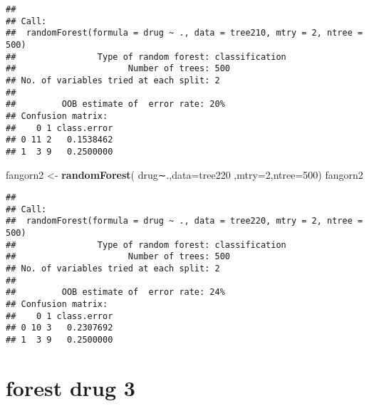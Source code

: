 \documentclass[]{article}
\newenvironment{Shaded}{\begin{snugshade}}{\end{snugshade}}
\newcommand{\KeywordTok}[1]{\textcolor[rgb]{0.13,0.29,0.53}{\textbf{#1}}}
\newcommand{\DataTypeTok}[1]{\textcolor[rgb]{0.13,0.29,0.53}{#1}}
\newcommand{\DecValTok}[1]{\textcolor[rgb]{0.00,0.00,0.81}{#1}}
\newcommand{\StringTok}[1]{\textcolor[rgb]{0.31,0.60,0.02}{#1}}
\newcommand{\CommentTok}[1]{\textcolor[rgb]{0.56,0.35,0.01}{\textit{#1}}}
\newcommand{\OperatorTok}[1]{\textcolor[rgb]{0.81,0.36,0.00}{\textbf{#1}}}
\newcommand{\NormalTok}[1]{#1}
\begin{document}
\begin{verbatim}
## 
## Call:
##  randomForest(formula = drug ~ ., data = tree210, mtry = 2, ntree = 500) 
##                Type of random forest: classification
##                      Number of trees: 500
## No. of variables tried at each split: 2
## 
##         OOB estimate of  error rate: 20%
## Confusion matrix:
##    0 1 class.error
## 0 11 2   0.1538462
## 1  3 9   0.2500000
\end{verbatim}

\begin{Shaded}
\begin{Highlighting}[]
\NormalTok{fangorn2 <-}\StringTok{ }\KeywordTok{randomForest}\NormalTok{( drug∼.,}\DataTypeTok{data=}\NormalTok{tree220  ,}\DataTypeTok{mtry=}\DecValTok{2}\NormalTok{,}\DataTypeTok{ntree=}\DecValTok{500}\NormalTok{)}
\NormalTok{fangorn2}
\end{Highlighting}
\end{Shaded}

\begin{verbatim}
## 
## Call:
##  randomForest(formula = drug ~ ., data = tree220, mtry = 2, ntree = 500) 
##                Type of random forest: classification
##                      Number of trees: 500
## No. of variables tried at each split: 2
## 
##         OOB estimate of  error rate: 24%
## Confusion matrix:
##    0 1 class.error
## 0 10 3   0.2307692
## 1  3 9   0.2500000
\end{verbatim}

\section{forest drug 3}\label{forest-drug-3}

\begin{Shaded}
\end{Shaded}
\end{document}

